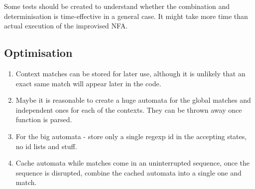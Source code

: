 Some tests should be created to understand whether the combination and
determinisation is time-effective in a general case. It might take more
time than actual execution of the improvised NFA.

\subsection{Optimisation}
\begin{enumerate}
    \item Context matches can be stored for later use, although it is
    unlikely that an exact same match will appear later in the code.
    \item Maybe it is reasonable to create a huge automata for the
    global matches and independent ones for each of the contexts. They
    can be thrown away once function is parsed.
    \item For the big automata - store only a single regexp id in the
    accepting states, no id lists and stuff.
    \item Cache automata while matches come in an uninterrupted
    sequence, once the sequence is disrupted, combine the cached
    automata into a single one and match.
\end{enumerate}
